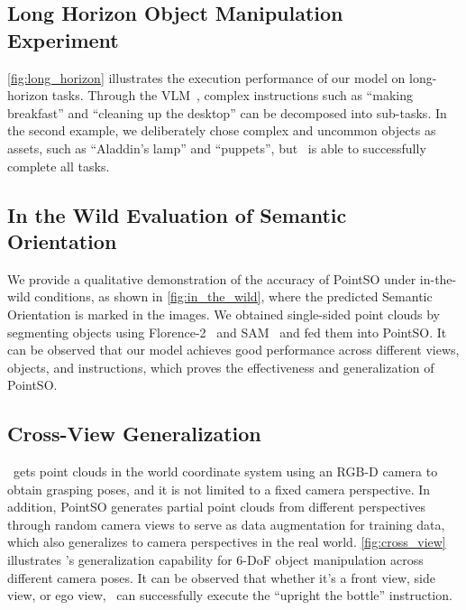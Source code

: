 \subsection{Long Horizon Object Manipulation Experiment}\label{app:long_horizon}
\cref{fig:long_horizon} illustrates the execution performance of our model on long-horizon tasks. Through the VLM~\cite{GPT4o24,gemini23}, complex instructions such as ``making breakfast'' and ``cleaning up the desktop'' can be decomposed into sub-tasks. In the second example, we deliberately chose complex and uncommon objects as assets, such as ``Aladdin's lamp'' and ``puppets'', but \sofar~is able to successfully complete all tasks.


\subsection{In the Wild Evaluation of Semantic Orientation}
We provide a qualitative demonstration of the accuracy of PointSO under in-the-wild conditions, as shown in \cref{fig:in_the_wild}, where the predicted Semantic Orientation is marked in the images. We obtained single-sided point clouds by segmenting objects using Florence-2~\cite{florence2} and SAM~\cite{SAM23} and fed them into PointSO. It can be observed that our model achieves good performance across different views, objects, and instructions, which proves the effectiveness and generalization of PointSO.




\subsection{Cross-View Generalization}
\sofar~gets point clouds in the world coordinate system using an RGB-D camera to obtain grasping poses, and it is not limited to a fixed camera perspective. In addition, PointSO generates partial point clouds from different perspectives through random camera views to serve as data augmentation for training data, which also generalizes to camera perspectives in the real world. \cref{fig:cross_view} illustrates \sofar's generalization capability for 6-DoF object manipulation across different camera poses. It can be observed that whether it's a front view, side view, or ego view, \sofar~can successfully execute the ``upright the bottle'' instruction.

